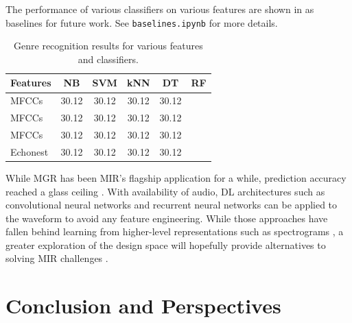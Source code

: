 \documentclass{article}
\begin{document}
The performance of various classifiers on various features are shown in  as baselines for future work.
See \texttt{baselines.ipynb} for more details.


\begin{table}
	\centering
	\begin{tabular}{lccccc}
		\toprule
		Features & NB & SVM & kNN & DT & RF \\
		\midrule
		MFCCs  & 30.12 & 30.12 & 30.12 & 30.12 \\
		MFCCs  & 30.12 & 30.12 & 30.12 & 30.12 \\
		MFCCs  & 30.12 & 30.12 & 30.12 & 30.12 \\
		Echonest  & 30.12 & 30.12 & 30.12 & 30.12 \\
		\bottomrule
	\end{tabular}
	\caption{Genre recognition results for various features and classifiers.}
	\label{tab:mgr}
\end{table}

While MGR has been MIR's flagship application for a while, prediction accuracy reached a glass ceiling \cite{mgr_why}.
With availability of audio, DL architectures such as convolutional neural networks and recurrent neural networks can be applied to the waveform to avoid any feature engineering. While those approaches have fallen behind learning from higher-level representations such as spectrograms \cite{dieleman_endtoend}, a greater exploration of the design space will hopefully provide alternatives to solving MIR challenges \cite{mir_dl_feature_learning}.


\section{Conclusion and Perspectives}

\end{document}

